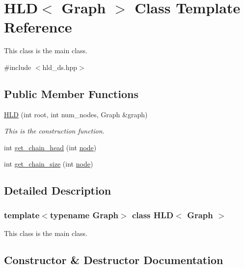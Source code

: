 \hypertarget{classHLD}{}\section{H\+LD$<$ Graph $>$ Class Template Reference}
\label{classHLD}


This class is the main class.  




{\ttfamily \#include $<$hld\+\_\+ds.\+hpp$>$}

\subsection*{Public Member Functions}
\begin{DoxyCompactItemize}
\item 
\hyperlink{classHLD_aeefaffdec17dca33f928fa8e9a2f44d1}{H\+LD} (int root, int num\+\_\+nodes, Graph \&graph)
\begin{DoxyCompactList}\small\item\em This is the construction function. \end{DoxyCompactList}\item 
int \hyperlink{classHLD_a68b3ca2eca7aa9aa6b72b8a6b73e79a9}{get\+\_\+chain\+\_\+head} (int \hyperlink{structnode}{node})
\item 
int \hyperlink{classHLD_a026eff6f1285da4accb3e6e3a3408b85}{get\+\_\+chain\+\_\+size} (int \hyperlink{structnode}{node})
\end{DoxyCompactItemize}


\subsection{Detailed Description}
\subsubsection*{template$<$typename Graph$>$\newline
class H\+L\+D$<$ Graph $>$}

This class is the main class. 

\subsection{Constructor \& Destructor Documentation}
\mbox{\label{classHLD_aeefaffdec17dca33f928fa8e9a2f44d1}} 
